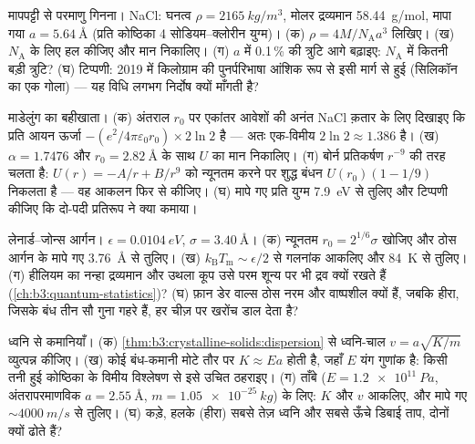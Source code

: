\begin{exercise}[$\star\star$]\label{exo:b3:crystalline-solids:6}
मापपट्टी से परमाणु गिनना। NaCl: घनत्व
$\rho = \qty{2165}{kg/m^3}$, मोलर द्रव्यमान \qty{58.44}{g/mol},
मापा गया  $a = \qty{5.64}{\angstrom}$ (प्रति कोष्ठिका 4
सोडियम--क्लोरीन युग्म)। (क) $\rho = 4M/N_{\text{A}}a^3$ लिखिए। (ख)
$N_{\text{A}}$ के लिए हल कीजिए और मान निकालिए। (ग) $a$ में 0.1\,\%
की त्रुटि आगे बढ़ाइए: $N_{\text{A}}$ में कितनी बड़ी त्रुटि? (घ)
टिप्पणी: 2019 में किलोग्राम की पुनर्परिभाषा आंशिक रूप से इसी
 मार्ग से हुई (सिलिकॉन का एक गोला) --- यह विधि लगभग
निर्दोष  क्यों माँगती है?
\end{exercise}

\begin{exercise}[$\star\star$]\label{exo:b3:crystalline-solids:7}
माडेलुंग का बहीखाता। (क) अंतराल $r_0$ पर एकांतर आवेशों की अनंत NaCl
क़तार के लिए दिखाइए कि प्रति आयन ऊर्जा
$-(e^2/4\pi\varepsilon_0r_0)\times2\ln2$ है --- अतः
एक-विमीय  $2\ln2 \approx 1.386$ है। (ख)
$\alpha = 1.7476$ और $r_0 = \qty{2.82}{\angstrom}$ के साथ
$U$ का मान निकालिए। (ग) बोर्न प्रतिकर्षण $r^{-9}$ की तरह चलता है:
$U(r) = -A/r + B/r^9$ को न्यूनतम करने पर शुद्ध बंधन $U(r_0)(1 - 1/9)$
निकलता है --- वह आकलन फिर से कीजिए। (घ) मापे गए प्रति युग्म
\qty{7.9}{eV} से तुलिए और टिप्पणी कीजिए कि दो-पदी प्रतिरूप ने क्या कमाया।
\end{exercise}

\begin{exercise}[$\star\star$]\label{exo:b3:crystalline-solids:8}
लेनार्ड--जोन्स आर्गन। $\epsilon = \qty{0.0104}{eV}$, $\sigma =
\qty{3.40}{\angstrom}$। (क) न्यूनतम $r_0 = 2^{1/6}
\sigma$ खोजिए और ठोस आर्गन के मापे गए
\qty{3.76}{\angstrom} से तुलिए। (ख)
$k_{\text{B}}T_{\text{m}} \sim \epsilon/2$ से गलनांक आकलिए और
\qty{84}{K} से तुलिए। (ग) हीलियम का नन्हा द्रव्यमान और उथला कूप उसे
परम शून्य पर भी द्रव क्यों रखते हैं
(\cref{ch:b3:quantum-statistics})? (घ)
फ़ान डेर वाल्स ठोस नरम और वाष्पशील क्यों हैं, जबकि हीरा, जिसके बंध
तीन सौ गुना गहरे हैं, हर चीज़ पर खरोंच डाल देता है?
\end{exercise}

\begin{exercise}[$\star\star$]\label{exo:b3:crystalline-solids:9}
ध्वनि से कमानियाँ। (क)
\cref{thm:b3:crystalline-solids:dispersion} से ध्वनि-चाल
$v = a\sqrt{K/m}$ व्युत्पन्न कीजिए। (ख) कोई बंध-कमानी मोटे तौर पर
$K \approx
Ea$ होती है, जहाँ $E$ यंग गुणांक है: किसी तनी हुई
कोष्ठिका के विमीय विश्लेषण से इसे उचित ठहराइए। (ग) ताँबे
($E = \qty{1.2e11}{Pa}$, अंतरापरमाणविक
$a = \qty{2.55}{\angstrom}$, $m =
\qty{1.05e-25}{kg}$) के लिए: $K$ और $v$ आकलिए, और मापे गए
$\sim\qty{4000}{m/s}$ से तुलिए। (घ) कड़े, हलके 
(हीरा) सबसे तेज़ ध्वनि और सबसे ऊँचे डिबाई
ताप, दोनों क्यों ढोते हैं?
\end{exercise}

